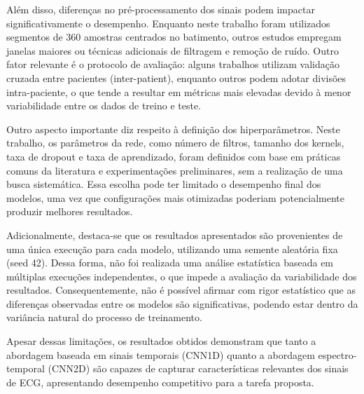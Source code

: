 Além disso, diferenças no pré-processamento dos sinais podem impactar significativamente o desempenho. Enquanto neste trabalho foram utilizados 
segmentos de 360 amostras centrados no batimento, outros estudos empregam janelas maiores ou técnicas adicionais de filtragem e remoção de ruído. Outro 
fator relevante é o protocolo de avaliação: alguns trabalhos utilizam validação cruzada entre pacientes (inter-patient), enquanto outros podem adotar 
divisões intra-paciente, o que tende a resultar em métricas mais elevadas devido à menor variabilidade entre os dados de treino e teste.

Outro aspecto importante diz respeito à definição dos hiperparâmetros. Neste trabalho, os parâmetros da rede, como número de filtros, tamanho dos 
kernels, taxa de dropout e taxa de aprendizado, foram definidos com base em práticas comuns da literatura e experimentações preliminares, sem a 
realização de uma busca sistemática. Essa escolha pode ter limitado o desempenho final dos modelos, uma vez que configurações mais otimizadas poderiam 
potencialmente produzir melhores resultados.

Adicionalmente, destaca-se que os resultados apresentados são provenientes de uma única execução para cada modelo, utilizando uma semente aleatória fixa (seed 42). 
Dessa forma, não foi realizada uma análise estatística baseada em múltiplas execuções independentes, o que impede a avaliação da variabilidade dos 
resultados. Consequentemente, não é possível afirmar com rigor estatístico que as diferenças observadas entre os modelos são significativas, podendo 
estar dentro da variância natural do processo de treinamento.

Apesar dessas limitações, os resultados obtidos demonstram que tanto a abordagem baseada em sinais temporais (CNN1D) quanto a abordagem 
espectro-temporal (CNN2D) são capazes de capturar características relevantes dos sinais de ECG, apresentando desempenho competitivo para a tarefa proposta.